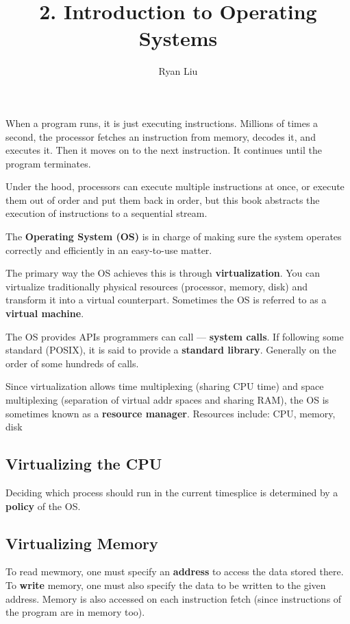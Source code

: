 \documentclass{article}
\title{2. Introduction to Operating Systems}
\author{Ryan Liu}
\begin{document}
\maketitle
\thispagestyle{empty}
\newpage
{}

\setcounter{section}{2}

When a program runs, it is just executing instructions.
Millions of times a second, the processor fetches an instruction from memory, decodes it, and executes it.
Then it moves on to the next instruction.
It continues until the program terminates.

Under the hood, processors can execute multiple instructions at once, or execute them out of order and put them back in order, but this book abstracts the execution of instructions to a sequential stream.

The \textbf{Operating System (OS)} is in charge of making sure the system operates correctly and efficiently in an easy-to-use matter.

The primary way the OS achieves this is through \textbf{virtualization}.
You can virtualize traditionally physical resources (processor, memory, disk) and transform it into a virtual counterpart.
Sometimes the OS is referred to as a \textbf{virtual machine}.

The OS provides APIs programmers can call --- \textbf{system calls}.
If following some standard (POSIX), it is said to provide a \textbf{standard library}.
Generally on the order of some hundreds of calls.

Since virtualization allows time multiplexing (sharing CPU time) and space multiplexing (separation of virtual addr spaces and sharing RAM), the OS is sometimes known as a \textbf{resource manager}.
Resources include: CPU, memory, disk

\subsection{Virtualizing the CPU}

Deciding which process should run in the current timesplice is determined by a \textbf{policy} of the OS.

\subsection{Virtualizing Memory}

To read mewmory, one must specify an \textbf{address} to access the data stored there.
To \textbf{write} memory, one must also specify the data to be written to the given address.
Memory is also accessed on each instruction fetch (since instructions of the program are in memory too).
\end{document}
